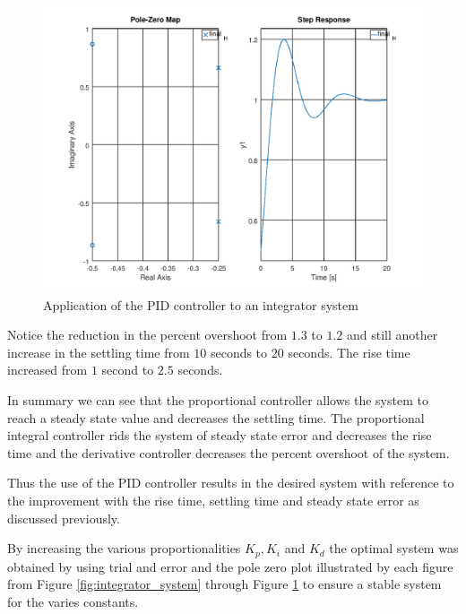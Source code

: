 \documentclass[a4paper, 12pt]{article}
\begin{document}
\begin{figure}[H]
	\centering
	\includegraphics[width=\textwidth]{integrator_system_proportional_integral_derivative_controller.png}
	\caption{Application of the PID controller to an integrator system}
	\label{fig:integrator_system_proportional_integral_derivative_controller}
\end{figure}

Notice the reduction in the percent overshoot from $1.3$ to $1.2$ and still another increase in the settling time from $10$ seconds to $20$ seconds. The rise time increased from $1$ second to $2.5$ seconds.

\par

In summary we can see that the proportional controller allows the system to reach a steady state value and decreases the settling time. The proportional integral controller rids the system of steady state error and decreases the rise time and the derivative controller decreases the percent overshoot of the system.

Thus the use of the PID controller results in the desired system with reference to the improvement with the rise time, settling time and steady state error as discussed previously.

By increasing the various proportionalities $K_p, K_i$ and $K_d$ the optimal system was obtained by using trial and error and the pole zero plot illustrated by each figure from Figure \ref{fig:integrator_system} through Figure \ref{fig:integrator_system_proportional_integral_derivative_controller} to ensure a stable system for the varies constants.




\end{document}
